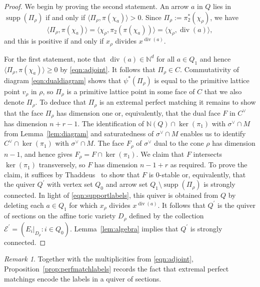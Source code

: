 \documentclass[11pt,a4paper]{amsart}
\numberwithin{equation}{section}
\theoremstyle{definition}
\theoremstyle{remark}
\newtheorem{remark}[theorem]{Remark}
\newcommand{\NN}{\ensuremath{\mathbb{N}}}
\renewcommand{\div}{\operatorname{div}}
\newcommand{\supp}{\operatorname{supp}}
\newcommand{\Ker}{\operatorname{ker}}
\begin{document}
  \begin{proof}
  We begin by proving the second statement.  An arrow $a$ in $Q$ lies in $\supp(\Pi_\rho)$ if and only if $\langle \Pi_\rho,\pi(\chi_a)\rangle >0$. Since $\Pi_\rho:= \pi_2^*(\chi_\rho)$, we have
   \begin{equation}
  \label{eqn:adjoint}
  \big\langle \Pi_\rho,\pi(\chi_a)\big\rangle = \big\langle \chi_\rho, \pi_2(\pi(\chi_a))\big \rangle = \big\langle \chi_\rho, \div(a)\big\rangle,
 \end{equation}
 and this is positive if and only if $x_\rho$ divides $x^{\div(a)}$. 
 
 For the first statement, note that $\div(a)\in \NN^d$ for all $a\in Q_1$ and hence $  \big\langle \Pi_\rho,\pi(\chi_a)\big\rangle\geq 0$ by \eqref{eqn:adjoint}. It follows that $\Pi_\rho\in C$. Commutativity of diagram \eqref{eqn:dualdiagram} shows that $\psi^*(\Pi_\rho)$ is equal to the primitive lattice point $v_\rho$ in $\rho$, so $\Pi_\rho$ is a primitive lattice point in some face of $C$ that we also denote $\Pi_\rho$. To deduce that $\Pi_\rho$ is an extremal perfect matching it remains to show that the face $\Pi_\rho$ has dimension one or, equivalently, that the dual face $F$ in $C^\vee$ has dimension $n+r-1$. The identification of $\NN(Q)\cap \Ker(\pi_1)$ with $\sigma^\vee\cap M$ from Lemma~\ref{lem:diagram} and saturatedness of $\sigma^\vee\cap M$ enables us to identify $C^\vee\cap \Ker(\pi_1)$ with $\sigma^\vee\cap M$. The face $F_\rho$ of $\sigma^\vee$ dual to the cone $\rho$ has dimension $n-1$, and hence \cite[Lemma~2.5]{CrawMaclagan} gives $F_\rho=F\cap \Ker(\pi_1)$. We claim that $F$ intersects $\Ker(\pi_1)$ transversely, so $F$ has dimension $n-1+r$ as required. To prove the claim, it suffices by Thaddeus~\cite[Lemma~3.3]{Thaddeus} to show that $F$ is $0$-stable or, equivalently, that the quiver $Q^\prime$ with vertex set $Q_0$ and arrow set $Q_1\setminus\supp(\Pi_\rho)$ is strongly connected. In light of \eqref{eqn:supportlabels}, this quiver is obtained from $Q$ by deleting each $a\in Q_1$ for which $x_\rho$ divides $x^{\div(a)}$. It follows that $Q^\prime$ is the quiver of sections on the affine toric variety $D_\rho$ defined by the collection $\mathscr{E}^\prime = (E_i\vert_{D_\rho} : i\in Q_0)$. Lemma~\ref{lem:algebra} implies that $Q^\prime$ is strongly connected.
  \end{proof}

\begin{remark}
Together with the multiplicities from \eqref{eqn:adjoint}, Proposition~\ref{prop:perfmatchlabels} records the fact that extremal perfect matchings encode the labels in a quiver of sections.
\end{remark}
\end{document}
